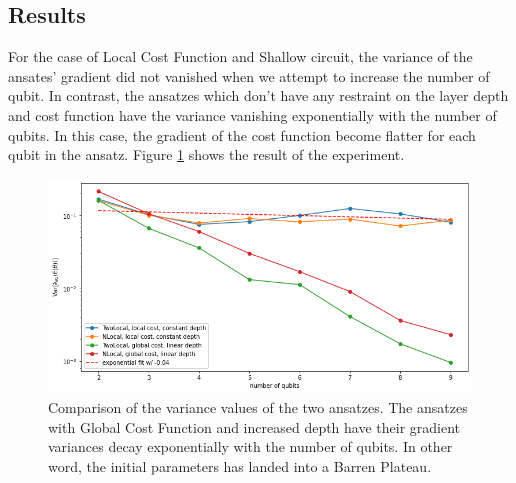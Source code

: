 \subsection{Results}

For the case of Local Cost Function and Shallow circuit, the variance of the ansates' gradient did not vanished when we attempt to increase the number of qubit.
In contrast, the ansatzes which don't have any restraint on the layer depth and cost function have the variance vanishing exponentially with the number of qubits.
In this case, the gradient of the cost function become flatter for each qubit in the ansatz.
Figure \ref{Variance Local Cost} shows the result of the experiment.

\begin{figure}
    \includegraphics[width=\textwidth]{Artefact/Appendices/variancesLCF.png}
    \caption{
        Comparison of the variance values of the two ansatzes.
        The ansatzes with Global Cost Function and increased depth have their gradient variances decay exponentially with the number of qubits. In other word, the initial parameters has landed into a Barren Plateau.
    }
    \label{Variance Local Cost}
\end{figure}